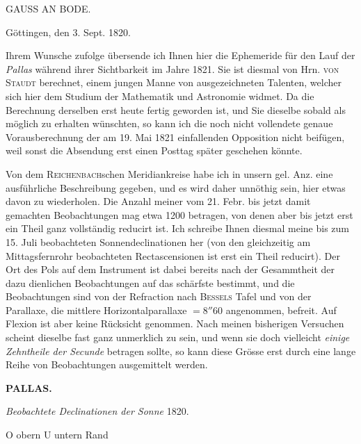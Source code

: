 \par{}\bigskip
\hypertarget{native-438-part-lower}{}
\begin{center}
{\large GAUSS AN BODE.}
\end{center}

\hfill Göttingen, den 3. Sept. 1820.

\par\indent Ihrem Wunsche zufolge übersende ich Ihnen hier die Ephemeride für den Lauf der
\emph{Pallas} während ihrer Sichtbarkeit im Jahre 1821. Sie ist diesmal von Hrn. \textsc{von Staudt} berechnet, einem jungen Manne von ausgezeichneten Talenten, welcher sich
hier dem Studium der Mathematik und Astronomie widmet. Da die Berechnung derselben erst
heute fertig geworden ist, und Sie dieselbe sobald als möglich zu erhalten wünschten, so
kann ich die noch nicht vollendete genaue Vorausberechnung der am 19. Mai 1821
einfallenden Opposition nicht beifügen, weil sonst die Absendung erst einen Posttag
später geschehen könnte.

Von dem \textsc{Reichenbach}schen Meridiankreise habe ich in unsern gel. Anz. eine
ausführliche Beschreibung gegeben, und es wird daher unnöthig sein, hier etwas davon zu
wiederholen. Die Anzahl meiner vom 21. Febr. bis jetzt damit gemachten Beobachtungen mag
etwa 1200 betragen, von denen aber bis jetzt erst ein Theil ganz vollständig reducirt
ist. Ich schreibe Ihnen diesmal meine bis zum 15. Juli beobachteten
Sonnendeclinationen her (von den gleichzeitig am Mittagsfernrohr beobachteten
Rectascensionen ist erst ein Theil reducirt). Der Ort des Pols auf dem Instrument ist
dabei bereits nach der Gesammtheit der dazu dienlichen Beobachtungen auf das schärfste
bestimmt, und die Beobachtungen sind von der Refraction nach \textsc{Bessels} Tafel und
von der Parallaxe, die mittlere Horizontalparallaxe $=8''60$ angenommen, befreit. Auf
Flexion ist aber keine Rücksicht genommen. Nach meinen bisherigen Versuchen scheint
dieselbe fast ganz unmerklich zu sein, und wenn sie doch vielleicht \emph{einige
Zehntheile der Secunde} betragen sollte, so kann diese Grösse erst durch eine lange
Reihe von Beobachtungen ausgemittelt werden.


\clearpage
\noindent{}%
%
\parbox[t]{\dimexpr\linewidth-24mm\relax}{\centering\footnotesize\bfseries PALLAS.\par}%
\makebox[12mm][r]{}\par\nobreak\medskip
\begin{center}
\emph{Beobachtete Declinationen der Sonne} 1820.

O obern \quad U untern Rand
\end{center}

